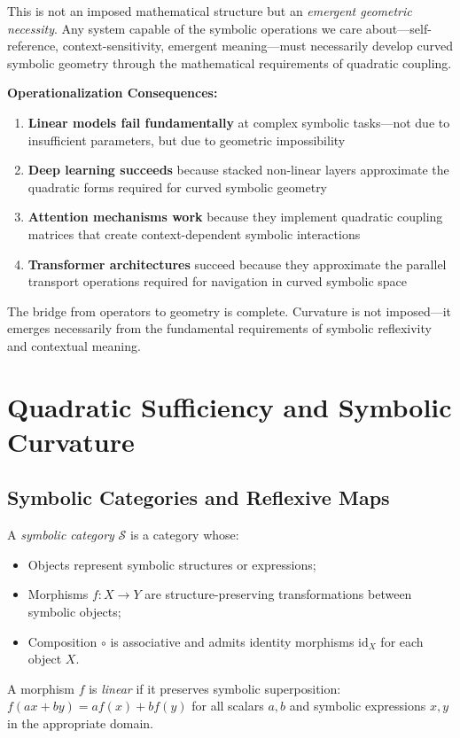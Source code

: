 This is not an imposed mathematical structure but an \textit{emergent geometric necessity}. Any system capable of the symbolic operations we care about—self-reference, context-sensitivity, emergent meaning—must necessarily develop curved symbolic geometry through the mathematical requirements of quadratic coupling.

\textbf{Operationalization Consequences:}
\begin{enumerate}
\item \textbf{Linear models fail fundamentally} at complex symbolic tasks—not due to insufficient parameters, but due to geometric impossibility
\item \textbf{Deep learning succeeds} because stacked non-linear layers approximate the quadratic forms required for curved symbolic geometry  
\item \textbf{Attention mechanisms work} because they implement quadratic coupling matrices that create context-dependent symbolic interactions
\item \textbf{Transformer architectures} succeed because they approximate the parallel transport operations required for navigation in curved symbolic space
\end{enumerate}

The bridge from operators to geometry is complete. Curvature is not imposed—it emerges necessarily from the fundamental requirements of symbolic reflexivity and contextual meaning.

\section{Quadratic Sufficiency and Symbolic Curvature}
\label{sec:bk1_quadratic_sufficiency_and_symbolic_curvature}

\subsection{Symbolic Categories and Reflexive Maps}
\label{subsec:bk1_symbolic_categories_and_reflexive_maps}

\begin{definition}
\label{definition:bk1_symbolic_category}
A \emph{symbolic category} $\mathcal{S}$ is a category whose:
\begin{itemize}
  \item Objects represent symbolic structures or expressions;
  \item Morphisms $f: X \to Y$ are structure-preserving transformations between symbolic objects;
  \item Composition $\circ$ is associative and admits identity morphisms $\text{id}_X$ for each object $X$.
\end{itemize}
A morphism $f$ is \emph{linear} if it preserves symbolic superposition: $f(ax + by) = af(x) + bf(y)$ for all scalars $a,b$ and symbolic expressions $x,y$ in the appropriate domain.
\end{definition}

